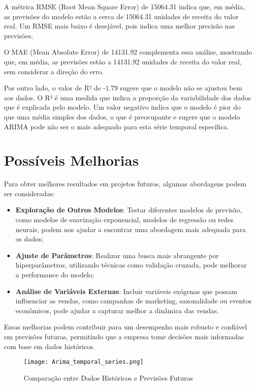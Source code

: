 \documentclass[a4paper,12pt]{article}
\begin{document}
A métrica RMSE (Root Mean Square Error) de 15064.31 indica que, em média, as previsões do modelo estão a cerca de 15064.31 unidades de receita do valor real. Um RMSE mais baixo é desejável, pois indica uma melhor precisão nas previsões. 

O MAE (Mean Absolute Error) de 14131.92 complementa essa análise, mostrando que, em média, as previsões estão a 14131.92 unidades de receita do valor real, sem considerar a direção do erro.

Por outro lado, o valor de R² de -1.79 sugere que o modelo não se ajustou bem aos dados. O R² é uma medida que indica a proporção da variabilidade dos dados que é explicada pelo modelo. Um valor negativo indica que o modelo é pior do que uma média simples dos dados, o que é preocupante e sugere que o modelo ARIMA pode não ser o mais adequado para esta série temporal específica.

\section{Possíveis Melhorias}

Para obter melhores resultados em projetos futuros, algumas abordagens podem ser consideradas:

\begin{itemize}
    \item \textbf{Exploração de Outros Modelos}: Testar diferentes modelos de previsão, como modelos de suavização exponencial, modelos de regressão ou redes neurais, podem nos ajudar a encontrar uma abordagem mais adequada para os dados;
    \item \textbf{Ajuste de Parâmetros}: Realizar uma busca mais abrangente por hiperparâmetros, utilizando técnicas como validação cruzada, pode melhorar a performance do modelo;
    \item \textbf{Análise de Variáveis Externas}: Incluir variáveis exógenas que possam influenciar as vendas, como campanhas de marketing, sazonalidade ou eventos econômicos, pode ajudar a capturar melhor a dinâmica das vendas.
\end{itemize}

Essas melhorias podem contribuir para um desempenho mais robusto e confiável em previsões futuras, permitindo que a empresa tome decisões mais informadas com base em dados históricos.

\begin{figure}[H]
    \centering
    \texttt{[image: Arima\_temporal\_series.png]} %
    \caption{Comparação entre Dados Históricos e Previsões Futuras}
    \label{fig:comparacao}
\end{figure}
\end{document}
